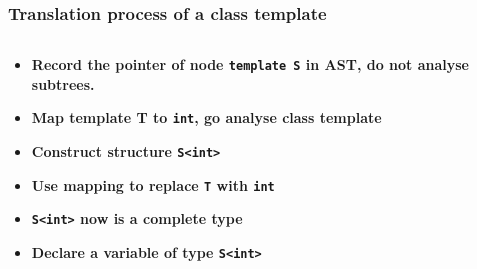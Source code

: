 \documentclass{beamer}
\begin{document}
\begin{frame}
    \frametitle{Translation process of a class template}

    \begin{columns}

        \begin{column}[]{0.5\textwidth}
            \begin{itemize}
                \small
                \pause
                \item \textbf<2>{Record the pointer of node \lstinline{template S} in AST, do not analyse subtrees. }\pause
                      \pause
                      \pause
                \item \textbf<5>{Map template T to \lstinline{int}, go analyse class template}\pause
                \item \textbf<6>{Construct structure \lstinline{S<int>}}\pause
                      \pause
                \item \textbf<8>{Use mapping to replace \lstinline{T} with \lstinline{int}}\pause
                      \pause
                \item \textbf<10>{\lstinline{S<int>} now is a complete type }\pause
                \item \textbf<11>{Declare a variable of type \lstinline{S<int>}}
            \end{itemize}
        \end{column}
    \end{columns}

\end{frame}
\end{document}
